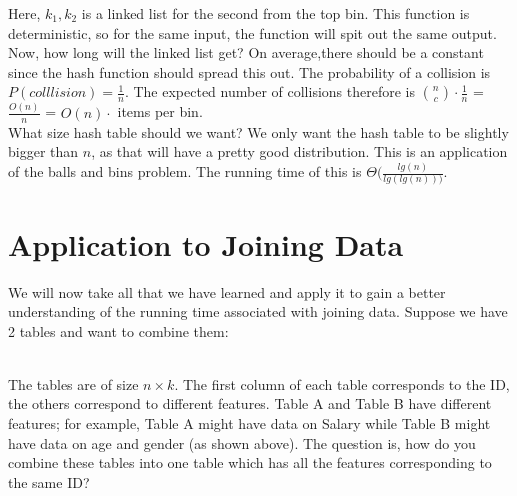 Here, $k_{1},k_{2}$ is a linked list for the second from the top bin. This function is deterministic, so for the same input, the function will spit out the same output. Now, how long will the linked list get? On average,there should be a constant since the hash function should spread this out. The probability of a collision is $P(colllision) = \frac{1}{n}$. The expected number of collisions therefore is ${n \choose c} \cdot \frac{1}{n}$ = $\frac{O(n)}{n}$ = $O(n) \cdot$ items per bin. \\

What size hash table should we want? We only want the hash table to be slightly bigger than $n$, as that will have a pretty good distribution. This is an application of the balls and bins problem. The running time of this is $\Theta(\frac{lg(n)}{lg(lg(n)))}$.

\section{Application to Joining Data}

We will now take all that we have learned and apply it to gain a better understanding of the running time associated with joining data. Suppose we have 2 tables and want to combine them: \\

 \\

The tables are of size $n\times{k}$. The first column of each table corresponds to the ID, the others correspond to different features. Table A and Table B have different features; for example, Table A might have data on Salary while Table B might have data on age and gender (as shown above). The question is, how do you combine these tables into one table which has all the features corresponding to the same ID? \\

